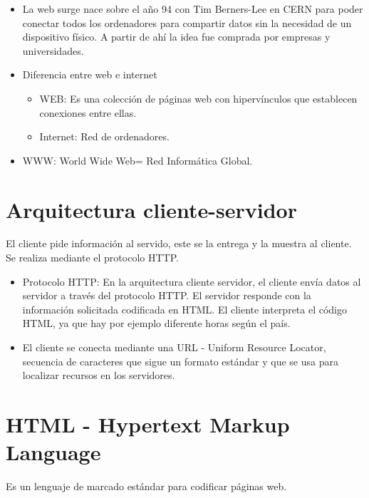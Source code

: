 \documentclass[12pt, twoside, openright]{report} %
\begin{document}
  \begin{itemize}
  
  \item
    La web surge nace sobre el año 94 con Tim Berners-Lee en CERN para
    poder conectar todos los ordenadores para compartir datos sin la
    necesidad de un dispositivo físico. A partir de ahí la idea fue
    comprada por empresas y universidades.
  \item
    Diferencia entre web e internet

    \begin{itemize}
    
    \item
      WEB: Es una colección de páginas web con hipervínculos que
      establecen conexiones entre ellas.
    \item
      Internet: Red de ordenadores.
    \end{itemize}
  \item
    WWW: World Wide Web= Red Informática Global.
  \end{itemize}

\section{Arquitectura cliente-servidor}

  El cliente pide información al servido, este se la entrega y la
  muestra al cliente. Se realiza mediante el protocolo HTTP.

  \begin{itemize}
  
  \item
    Protocolo HTTP: En la arquitectura cliente servidor, el cliente
    envía datos al servidor a través del protocolo HTTP. El servidor
    responde con la información solicitada codificada en HTML. El
    cliente interpreta el código HTML, ya que hay por ejemplo diferente
    horas según el país.
  \item
    El cliente se conecta mediante una URL - Uniform Resource Locator,
    secuencia de caracteres que sigue un formato estándar y que se usa
    para localizar recursos en los servidores.
  \end{itemize}

\section{HTML - Hypertext Markup Language}

  Es un lenguaje de marcado estándar para codificar páginas web.
\end{document}
